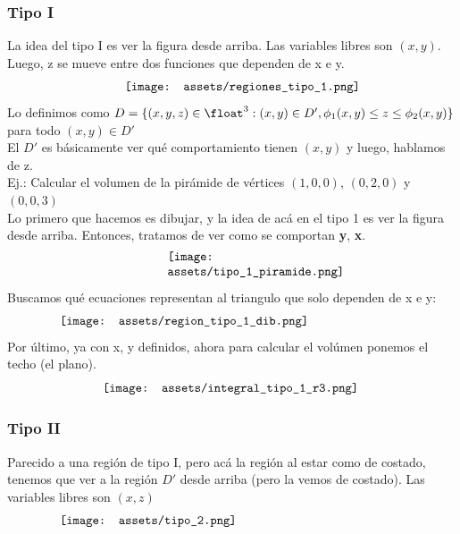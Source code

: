 \documentclass[10pt,a4paper]{article}
\begin{document}
\subsubsection*{Tipo I}
La idea del tipo I es ver la figura desde arriba. Las variables libres son $(x,y)$. Luego, z se mueve entre dos funciones que dependen de x e y. 
\[\begin{minipage}[b]{0.5\textwidth}
    \texttt{[image: assets/regiones\_tipo\_1.png]}
\end{minipage}\]
Lo definimos como $D = \{(x,y,z) \in \float^{3} : (x,y) \in D', \phi_{1} (x,y) \le z \le \phi_{2}(x,y) \}$ para todo $(x,y) \in D'$ \\
El $D'$ es básicamente ver qué comportamiento tienen $(x,y)$ y luego, hablamos de z.\\
Ej.: Calcular el volumen de la pirámide de vértices $(1,0,0)$, $(0,2,0)$ y $(0,0,3)$ \\
Lo primero que hacemos es dibujar, y la idea de acá en el tipo 1 es ver la figura desde arriba. Entonces, tratamos de ver como se comportan \textbf{y}, \textbf{x}. 
\[\begin{minipage}[b]{0.3\textwidth}
    \texttt{[image: assets/tipo\_1\_piramide.png]}
\end{minipage}\]
Buscamos qué ecuaciones representan al triangulo que solo dependen de x e y: 
\[\begin{minipage}[b]{0.8\textwidth}
    \texttt{[image: assets/region\_tipo\_1\_dib.png]}
\end{minipage}\]
Por último, ya con x, y definidos, ahora para calcular el volúmen ponemos el techo (el plano).
\[\begin{minipage}[b]{0.6\textwidth}
    \texttt{[image: assets/integral\_tipo\_1\_r3.png]}
\end{minipage}\]
\subsubsection*{Tipo II}
Parecido a una región de tipo I, pero acá la región al estar como de costado, tenemos que ver a la región $D'$ desde arriba (pero la vemos de costado). Las variables libres son $(x,z)$
\[\begin{minipage}[b]{0.8\textwidth}
    \texttt{[image: assets/tipo\_2.png]}
\end{minipage}\]
\end{document}
